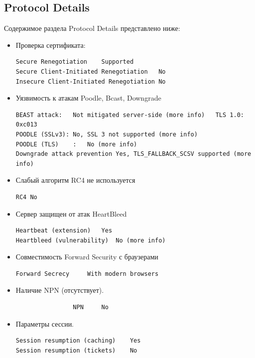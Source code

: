 \documentclass[10pt,a4paper]{report}
\begin{document}
		\subsection{Protocol Details}
			Содержимое раздела Protocol Details представлено ниже:
			\begin{itemize}
				\item Проверка сертификата:
				\begin{lstlisting}
Secure Renegotiation	Supported
Secure Client-Initiated Renegotiation	No
Insecure Client-Initiated Renegotiation	No
				\end{lstlisting}
				
				\item Уязвимость к атакам Poodle, Bcast, Downgrade
				\begin{lstlisting}
BEAST attack: 	Not mitigated server-side (more info)   TLS 1.0: 0xc013
POODLE (SSLv3):	No, SSL 3 not supported (more info)
POODLE (TLS)	: 	No (more info)
Downgrade attack prevention	Yes, TLS_FALLBACK_SCSV supported (more info)
				\end{lstlisting}
				
				\item Слабый алгоритм RC4 не используется
				\begin{lstlisting}
RC4	No
				\end{lstlisting}
				
				\item Сервер защищен от атак HeartBleed
				\begin{lstlisting}
Heartbeat (extension)	Yes
Heartbleed (vulnerability)	No (more info)
				\end{lstlisting}
				
				\item Совместимость Forward Security с браузерами
				\begin{lstlisting}
Forward Secrecy	 	With modern browsers
				\end{lstlisting}
				
				\item Наличие NPN (отсутствует).

				\begin{lstlisting}
				NPN	 	No
				\end{lstlisting}
				
				\item Параметры сессии.
				\begin{lstlisting}
Session resumption (caching)	Yes
Session resumption (tickets)	No
				\end{lstlisting}
				

\end{itemize}
\end{document}
